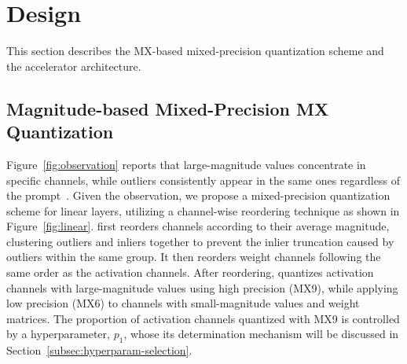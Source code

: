 \vspace{-0.3cm}
\section{Design}
\vspace{-0.1cm}
%
This section describes the MX-based mixed-precision quantization scheme and the \sysname accelerator architecture. 
%

\vspace{-0.35cm}
\subsection{Magnitude-based Mixed-Precision MX Quantization}
%
%
Figure~\ref{fig:observation} reports that large-magnitude values concentrate in specific channels, while outliers consistently appear in the same ones regardless of the prompt~\cite{qdit}. 
% 
Given the observation, we propose a mixed-precision quantization scheme for linear layers, utilizing a channel-wise reordering technique as shown in Figure~\ref{fig:linear}.
%
\sysname first reorders channels according to their average magnitude, clustering outliers and inliers together to prevent the inlier truncation caused by outliers within the same group.
%
It then reorders weight channels following the same order as the activation channels.
%
After reordering, \sysname quantizes activation channels with large-magnitude values using high precision (MX9), while applying low precision (MX6) to channels with small-magnitude values and weight matrices.
%
The proportion of activation channels quantized with MX9 is controlled by a hyperparameter, $p_1$, whose its determination mechanism will be discussed in Section~\ref{subsec:hyperparam-selection}. 
%

